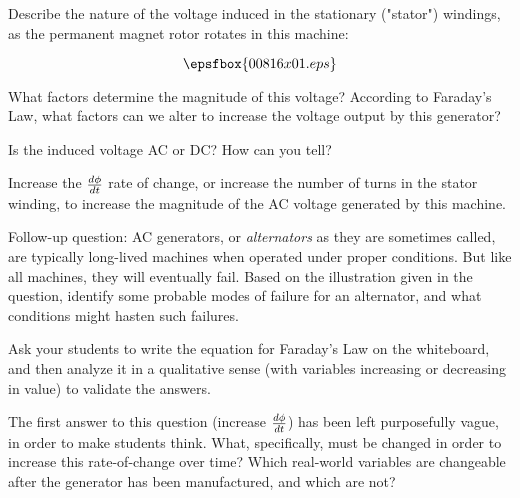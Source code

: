 

Describe the nature of the voltage induced in the stationary ("stator") windings, as the permanent magnet rotor rotates in this machine:

$$\epsfbox{00816x01.eps}$$

What factors determine the magnitude of this voltage?  According to Faraday's Law, what factors can we alter to increase the voltage output by this generator?

Is the induced voltage AC or DC?  How can you tell?







Increase the ${d\phi \over dt}$ rate of change, or increase the number of turns in the stator winding, to increase the magnitude of the AC voltage generated by this machine.

\vskip 10pt

Follow-up question: AC generators, or {\it alternators} as they are sometimes called, are typically long-lived machines when operated under proper conditions.  But like all machines, they will eventually fail.  Based on the illustration given in the question, identify some probable modes of failure for an alternator, and what conditions might hasten such failures.







Ask your students to write the equation for Faraday's Law on the whiteboard, and then analyze it in a qualitative sense (with variables increasing or decreasing in value) to validate the answers.

The first answer to this question (increase ${d\phi \over dt}$) has been left purposefully vague, in order to make students think.  What, specifically, must be changed in order to increase this rate-of-change over time?  Which real-world variables are changeable after the generator has been manufactured, and which are not?




